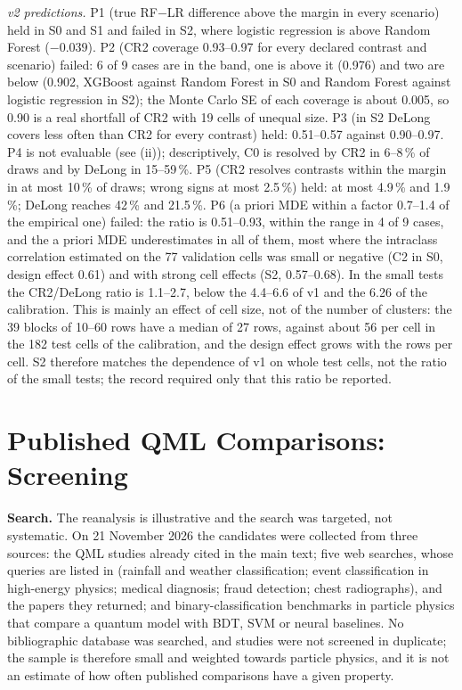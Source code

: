 \documentclass[11pt,a4paper]{article}
\begin{document}
\emph{v2 predictions.} P1 (true RF$-$LR difference above the margin in every scenario) held in S0 and S1 and failed in S2, where logistic regression is above Random Forest ($-0.039$). P2 (CR2 coverage 0.93--0.97 for every declared contrast and scenario) failed: 6 of 9 cases are in the band, one is above it (0.976) and two are below (0.902, XGBoost against Random Forest in S0 and Random Forest against logistic regression in S2); the Monte Carlo SE of each coverage is about 0.005, so 0.90 is a real shortfall of CR2 with 19 cells of unequal size. P3 (in S2 DeLong covers less often than CR2 for every contrast) held: 0.51--0.57 against 0.90--0.97. P4 is not evaluable (see (ii)); descriptively, C0 is resolved by CR2 in 6--8\,\% of draws and by DeLong in 15--59\,\%. P5 (CR2 resolves contrasts within the margin in at most 10\,\% of draws; wrong signs at most 2.5\,\%) held: at most 4.9\,\% and 1.9\,\%; DeLong reaches 42\,\% and 21.5\,\%. P6 (a priori MDE within a factor 0.7--1.4 of the empirical one) failed: the ratio is 0.51--0.93, within the range in 4 of 9 cases, and the a priori MDE underestimates in all of them, most where the intraclass correlation estimated on the 77 validation cells was small or negative (C2 in S0, design effect 0.61) and with strong cell effects (S2, 0.57--0.68). In the small tests the CR2/DeLong ratio is 1.1--2.7, below the 4.4--6.6 of v1 and the 6.26 of the calibration. This is mainly an effect of cell size, not of the number of clusters: the 39 blocks of 10--60 rows have a median of 27 rows, against about 56 per cell in the 182 test cells of the calibration, and the design effect grows with the rows per cell. S2 therefore matches the dependence of v1 on whole test cells, not the ratio of the small tests; the record required only that this ratio be reported.

\section{Published QML Comparisons: Screening}
\label{app:literature}

\textbf{Search.} The reanalysis is illustrative and the search was targeted, not systematic. On 21 November 2026 the candidates were collected from three sources: the QML studies already cited in the main text; five web searches, whose queries are listed in  (rainfall and weather classification; event classification in high-energy physics; medical diagnosis; fraud detection; chest radiographs), and the papers they returned; and binary-classification benchmarks in particle physics that compare a quantum model with BDT, SVM or neural baselines. No bibliographic database was searched, and studies were not screened in duplicate; the sample is therefore small and weighted towards particle physics, and it is not an estimate of how often published comparisons have a given property.
\end{document}
